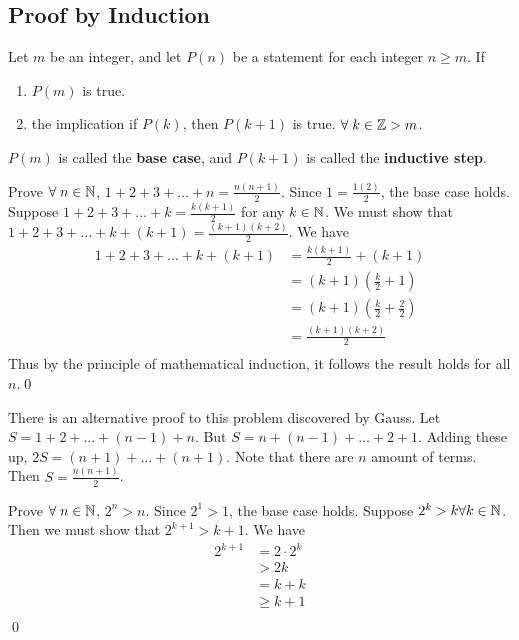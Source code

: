 \documentclass{article}
\begin{document}
\subsection{Proof by Induction}
\begin{definition}
  Let $m$ be an integer, and let $P(n)$ be a statement for each integer $n \geq m$. If
  \begin{enumerate}
    \item $P(m)$ is true.
    \item the implication if $P(k)$, then $P(k+1)$ is true. $\forall \; k \in \mathbb{Z} > m$.
  \end{enumerate}
  $P(m)$ is called the \textbf{base case}, and $P(k+1)$ is called the \textbf{inductive step}.
\end{definition}
\begin{example}
  Prove $\forall \; n \in \mathbb{N}$, $1 + 2 + 3 + \ldots + n = \frac{n(n+1)}{2}$.
  Since $1 = \frac{1(2)}{2}$, the base case holds.
  Suppose $1 + 2 + 3 + \ldots + k = \frac{k(k+1)}{2}$ for any $k \in \mathbb{N}$. We must show that $1 + 2 + 3 + \ldots + k + (k+1)= \frac{(k+1)(k+2)}{2}$.\newline
  We have
  \begin{align*}
    1 + 2 + 3 + \ldots + k + (k+ 1) &= \frac{k(k+1)}{2} + (k + 1)\\
    &= (k+1)(\frac{k}{2}+1)\\
    &= (k+1)(\frac{k}{2}+\frac{2}{2})\\
    &= \frac{(k+1)(k+2)}{2}\\
  \end{align*}
  Thus by the principle of mathematical induction, it follows the result holds for all $n$.\qed
\end{example}
\begin{remark}
  There is an alternative proof to this problem discovered by Gauss.
  Let $S = 1 + 2 + \dots + (n-1) + n$.
  But $S = n + (n-1) + \dots + 2 + 1$.
  Adding these up, $2S = (n+1) + \dots + (n+1)$. Note that there are $n$ amount of terms.
  Then $S = \frac{n(n+1)}{2}$.
\end{remark}
\begin{example}
  Prove $\forall \; n \in \mathbb{N}$, $2^n > n$.
  Since $2^1 > 1$, the base case holds.
  Suppose $2^k > k \forall k \in \mathbb{N}$. Then we must show that $2^{k+1} > k+1$.
  We have
  \begin{align*}
    2^{k+1} &= 2 \cdot 2^k\\
    &> 2k\\
    &= k + k\\
    &\geq k + 1 \tag{k $\geq$ 1 from def.}\\
  \end{align*}
  \qed
\end{example}
\end{document}
